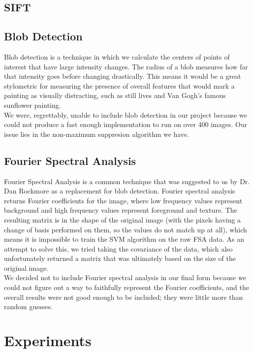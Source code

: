 \documentclass[twocolumn]{article}
\begin{document}
  \subsection{SIFT}

  \subsection{Blob Detection}
  Blob detection is a technique in which we calculate the centers of points of
  interest that have large intensity changes. The radius of a blob measures
  how far that intensity goes before changing drastically. This means it would
  be a great stylometric for measuring the presence of overall features that
  would mark a painting as visually distracting, such as still lives and Van
  Gogh's famous sunflower painting. \\

  We were, regrettably, unable to include blob detection in our project
  because we could not produce a fast enough implementation to run on over 400
  images. Our issue lies in the non-maximum suppresion algorithm we have.

  \subsection{Fourier Spectral Analysis}
  Fourier Spectral Analysis is a common technique that was suggested to us by
  Dr. Dan Rockmore as a replacement for blob detection. Fourier spectral
  analysis returns Fourier coefficients for the image, where low frequency
  values represent background and high frequency values represent foreground
  and texture. The resulting matrix is in the shape of the original image
  (with the pixels having a change of basis performed on them, so the values
  do not match up at all), which means it is impossible to train the SVM
  algorithm on the raw FSA data. As an attempt to solve this, we tried taking
  the covariance of the data, which also unfortunately returned a matrix that
  was ultimately based on the size of the original image. \\

  We decided not to include Fourier spectral analysis in our final form
  because we could not figure out a way to faithfully represent the Fourier
  coefficients, and the overall results were not good enough to be included;
  they were little more than random guesses.

  \section{Experiments}
\end{document}
